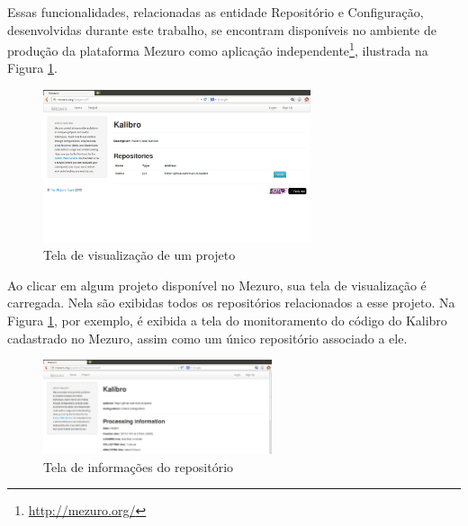 
Essas funcionalidades, relacionadas as entidade Repositório e Configuração, desenvolvidas durante este trabalho, se encontram disponíveis no ambiente de produção da plataforma Mezuro como aplicação independente\footnote{\url{http://mezuro.org/}},  ilustrada na Figura \ref{fig:mezuro-repositories}.

\graphicspath{{figuras/}}
\begin{figure}[h]
\centering
\includegraphics[width=0.7\textwidth]{mezuro-repositories}
\caption{Tela de visualização de um projeto}
\label{fig:mezuro-repositories}
\end{figure}

Ao clicar em algum projeto disponível no Mezuro, sua tela de visualização é carregada. Nela são exibidas todos os repositórios relacionados a esse projeto. Na Figura \ref{fig:mezuro-repositories}, por exemplo, é exibida a tela do monitoramento do código do Kalibro cadastrado no Mezuro, assim como um único repositório associado a ele.

\graphicspath{{figuras/}}
\begin{figure}[h]
\centering
\includegraphics[width=0.6\textwidth]{mezuro-info}
\caption{Tela de informações do repositório}
\label{fig:mezuro-info}
\end{figure}

